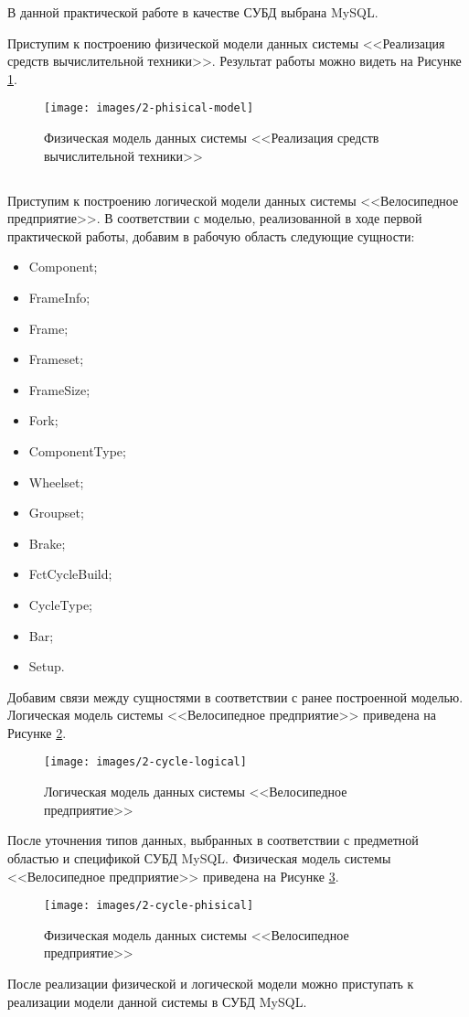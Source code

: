 В данной практической работе в качестве СУБД выбрана MySQL.

Приступим к построению физической модели данных системы <<Реализация средств вычислительной техники>>. Результат работы можно видеть на Рисунке \ref{fig:2-phisical-model}.

\begin{figure}[h!]
	\centering
	\texttt{[image: images/2-phisical-model]}
	\caption{Физическая модель данных системы <<Реализация средств вычислительной техники>>}
	\label{fig:2-phisical-model}
\end{figure}
\newpage
\subsection{\individual}
Приступим к построению логической модели данных системы <<Велосипедное предприятие>>. 
В соответствии с моделью, реализованной в ходе первой практической работы, добавим в рабочую область следующие сущности:
\begin{itemize}
	\item Component;
	\item FrameInfo;
	\item Frame;
	\item Frameset;
	\item FrameSize;
	\item Fork;
	\item ComponentType;
	\item Wheelset;
	\item Groupset;
	\item Brake;
	\item FctCycleBuild;
	\item CycleType;
	\item Bar;
	\item Setup.
\end{itemize}
Добавим связи между сущностями в соответствии с ранее построенной моделью. Логическая модель системы <<Велосипедное предприятие>> приведена на Рисунке \ref{fig:2-cycle-logical}.

\begin{figure}[h!]
	\centering
	\texttt{[image: images/2-cycle-logical]}
	\caption{Логическая модель данных системы <<Велосипедное предприятие>>}
	\label{fig:2-cycle-logical}
\end{figure}

После уточнения типов данных, выбранных в соответствии с предметной областью и спецификой СУБД MySQL.
Физическая модель системы <<Велосипедное предприятие>> приведена на Рисунке \ref{fig:2-cycle-phisical}.

\begin{figure}[h!]
	\centering
	\texttt{[image: images/2-cycle-phisical]}
	\caption{Физическая модель данных системы <<Велосипедное предприятие>>}
	\label{fig:2-cycle-phisical}
\end{figure}

После реализации физической и логической модели можно приступать к реализации модели данной системы в СУБД MySQL.
\hfill